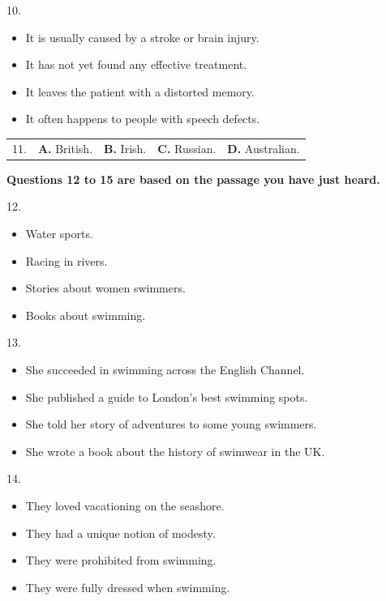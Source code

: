 \documentclass[UTF8,11pt]{ctexart}
\begin{document}
10.


\begin{itemize}[leftmargin=2em,itemsep=.2em,topsep=.4em]\item[A.] It is usually caused by a stroke or brain injury.
\item[B.] It has not yet found any effective treatment.
\item[C.] It leaves the patient with a distorted memory.
\item[D.] It often happens to people with speech defects.
\end{itemize}

\noindent\begin{tabularx}{\linewidth}{@{}lXXXX@{}}11. & \textbf{A.} British. & \textbf{B.} Irish. & \textbf{C.} Russian. & \textbf{D.} Australian.\\\end{tabularx}\par

\textbf{Questions 12 to 15 are based on the passage you have just heard.}


12.


\begin{itemize}[leftmargin=2em,itemsep=.2em,topsep=.4em]\item[A.] Water sports.
\item[B.] Racing in rivers.
\item[C.] Stories about women swimmers.
\item[D.] Books about swimming.
\end{itemize}

13.


\begin{itemize}[leftmargin=2em,itemsep=.2em,topsep=.4em]\item[A.] She succeeded in swimming across the English Channel.
\item[B.] She published a guide to London’s best swimming spots.
\item[C.] She told her story of adventures to some young swimmers.
\item[D.] She wrote a book about the history of swimwear in the UK.
\end{itemize}

14.


\begin{itemize}[leftmargin=2em,itemsep=.2em,topsep=.4em]\item[A.] They loved vacationing on the seashore.
\item[B.] They had a unique notion of modesty.
\item[C.] They were prohibited from swimming.
\item[D.] They were fully dressed when swimming.
\end{itemize}
\end{document}
